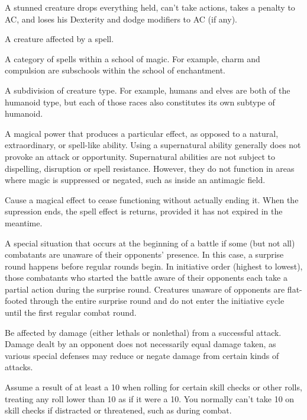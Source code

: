  A stunned creature drops everything held, can't take 
actions, takes a  penalty to AC, and loses his 
Dexterity and dodge modifiers to AC (if any). 

 A creature affected by a spell. 

 A category of spells within a school of magic. For example, 
charm and compulsion are subschools within the school of enchantment. 

 A subdivision  of creature type. For example, humans and elves are both  of the humanoid type, but each  of those races also constitutes its  own subtype of humanoid. 

 A magical power that produces a 
particular effect, as opposed to a natural, extraordinary, or spell-like 
ability. Using a supernatural ability generally does not provoke an 
attack or opportunity. Supernatural abilities are not subject to 
dispelling, disruption or spell resistance. However, they do not 
function in areas where magic is suppressed or negated, such as 
inside an antimagic field. 

 Cause a magical effect to cease functioning without 
actually ending it. When the supression ends, the spell effect is 
returns, provided it has not expired in the meantime. 

 A special situation that occurs at the beginning of a 
battle if some (but not all) combatants are unaware of their opponents' presence. In this case, a surprise round happens before 
regular rounds begin. In initiative order (highest to lowest), those 
combatants who started the battle aware of their opponents each 
take a partial action during the surprise round. Creatures unaware of 
opponents are flat-footed through the entire surprise round and do 
not enter the initiative cycle until the first regular combat round.  

 Be affected by damage (either lethals or nonlethal) 
from a successful attack. Damage dealt by an opponent does not 
necessarily equal damage taken, as various special defenses may 
reduce or negate damage from certain kinds of attacks. 

 Assume a result of at least a 10 when rolling for certain skill checks or other rolls, treating any roll lower than 10 as if it were a 10. You normally can't take 10 on skill checks if distracted or threatened, such as during combat. 

